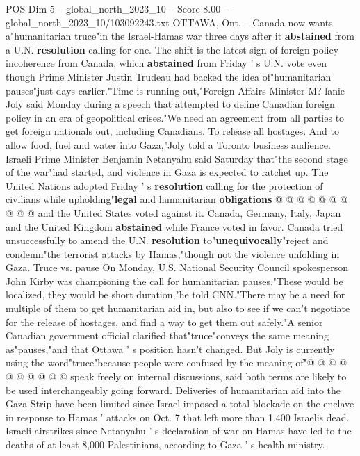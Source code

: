 \begin{textsample}{POS Dim 5 – global\_north\_2023\_10 – Score 8.00 – global\_north\_2023\_10/103092243.txt}  \label{ex:f5_pos_438}
OTTAWA, Ont. -- Canada now wants a"humanitarian truce"in the Israel-Hamas war three days after it \textbf{abstained} from a U.N. \textbf{resolution} calling for one.
The shift is the latest sign of foreign policy incoherence from Canada, which \textbf{abstained} from Friday ' s U.N. vote even though Prime Minister Justin Trudeau had backed the idea of"humanitarian pauses"just days earlier."Time is running out,"Foreign Affairs Minister M? lanie Joly said Monday during a speech that attempted to define Canadian foreign policy in an era of geopolitical crises."We need an agreement from all parties to get foreign nationals out, including Canadians.
To release all hostages.
And to allow food, fuel and water into Gaza,"Joly told a Toronto business audience.
Israeli Prime Minister Benjamin Netanyahu said Saturday that"the second stage of the war"had started, and violence in Gaza is expected to ratchet up.
The United Nations adopted Friday ' s \textbf{resolution} calling for the protection of civilians while upholding"\textbf{legal} and humanitarian \textbf{obligations} @ @ @ @ @ @ @ @ @ @ and the United States voted against it.
Canada, Germany, Italy, Japan and the United Kingdom \textbf{abstained} while France voted in favor.
Canada tried unsuccessfully to amend the U.N. \textbf{resolution} to"\textbf{unequivocally}"reject and condemn"the terrorist attacks by Hamas,"though not the violence unfolding in Gaza.
Truce vs. pause On Monday, U.S.
National Security Council spokesperson John Kirby was championing the call for humanitarian pauses."These would be localized, they would be short duration,"he told CNN."There may be a need for multiple of them to get humanitarian aid in, but also to see if we can't negotiate for the release of hostages, and find a way to get them out safely."A senior Canadian government official clarified that"truce"conveys the same meaning as"pauses,"and that Ottawa ' s position hasn't changed.
But Joly is currently using the word"truce"because people were confused by the meaning of"@ @ @ @ @ @ @ @ @ @ speak freely on internal discussions, said both terms are likely to be used interchangeably going forward.
Deliveries of humanitarian aid into the Gaza Strip have been limited since Israel imposed a total blockade on the enclave in response to Hamas ' attacks on Oct. 7 that left more than 1,400 Israelis dead.
Israeli airstrikes since Netanyahu ' s declaration of war on Hamas have led to the deaths of at least 8,000 Palestinians, according to Gaza ' s health ministry.

\end{textsample}
